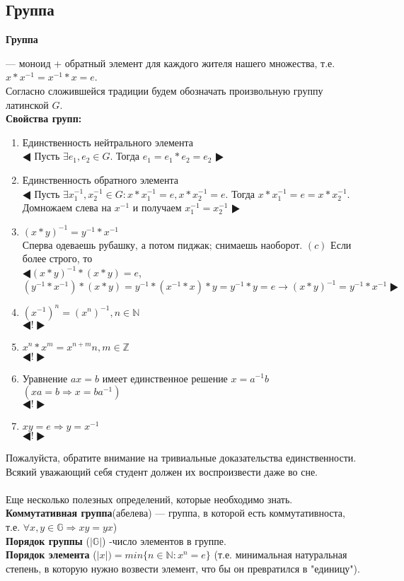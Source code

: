 \documentclass[12pt]{article}
\begin{document}
	\subsection{Группа}
		\hypertarget{indef:group}{\textbf{Группа}} — моноид + обратный элемент для каждого жителя нашего множества, т.е. $x*x^{-1} = x^{-1}*x = e$.\\
		Согласно сложившейся традиции будем обозначать произвольную группу латинской $G$. \\
		\hypertarget{inpro:group}{\textbf{Свойства групп:}}\begin{enumerate}
			\item Единственность нейтрального элемента \\
				$\LHD$ Пусть $\exists e_1, e_2 \in G$. Тогда $e_1 = e_1 * e_2 = e_2$ $\RHD$
			\item Единственность обратного элемента \\
				$\LHD$ Пусть $\exists x_1^{-1}, x_2^{-1} \in G : x* x_1^{-1} = e, x*x_2^{-1} = e$. Тогда $x*x_1^{-1} = e = x*x_2^{-1}$. Домножаем слева на $x^{-1}$ и получаем $ x_1^{-1} = x_2^{-1}$ $\RHD$
			\item $(x*y)^{-1}=y^{-1}*x^{-1}$ \\
				Сперва одеваешь рубашку, а потом пиджак; снимаешь наоборот. $(c)$ Если более строго, то \\
				$\LHD (x*y)^{-1} * (x*y) = e$, $(y^{-1}*x^{-1})*(x*y) = y^{-1}*(x^{-1}*x)*y = y^{-1}*y = e \rightarrow (x*y)^{-1} = y^{-1}*x^{-1} \RHD$
			\item $(x^{-1})^n=(x^n)^{-1} , n \in \mathds{N}$ \\
				$\LHD ! \RHD$
			\item $x^n*x^m=x^{n+m} n,m \in \mathds{Z} $ \\
				$\LHD ! \RHD$
			\item Уравнение $ax=b$ имеет единственное решение $x=a^{-1}b$ 
			$(xa=b\Rightarrow x=ba^{-1})$ \\
				$\LHD ! \RHD$
			\item $xy=e \Rightarrow y=x^{-1} $\\
				$\LHD ! \RHD$ \\
		\end{enumerate}
		Пожалуйста, обратите внимание на тривиальные доказательства единственности. Всякий уважающий себя студент должен их воспроизвести даже во сне. \\\\
		Еще несколько полезных определений, которые необходимо знать. \\
		\textbf{Коммутативная группа}(абелева) — группа, в которой есть коммутативноста, т.е. $\forall x, y \in \mathds{G} \Rightarrow xy=yx$)\\ 
		\hypertarget{indef:por_group}{\textbf{Порядок группы}} ($|\mathds{G}|$) -число элементов в группе.\\
		\hypertarget{indef:por_el}{\textbf{Порядок элемента}} ($|x|)= min \{ n\in\mathds{N} :x^n=e\}$ (т.е. минимальная натуральная степень, в которую нужно возвести элемент, что бы он превратился в "единицу"). \\
		
\end{document}
